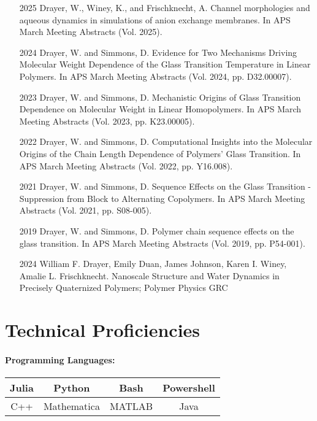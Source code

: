 \documentclass{my_cv}
\begin{document}
\begin{itemize}
    \item[2025] Drayer, W., Winey, K., and Frischknecht, A. Channel morphologies and aqueous dynamics in simulations of anion exchange membranes. In APS March Meeting Abstracts (Vol. 2025).
    \item[2024] Drayer, W. and Simmons, D. Evidence for Two Mechanisms Driving Molecular Weight Dependence of the Glass Transition Temperature in Linear Polymers. In APS March Meeting Abstracts (Vol. 2024, pp. D32.00007).
    \item[2023] Drayer, W. and Simmons, D. Mechanistic Origins of Glass Transition Dependence on Molecular Weight in Linear Homo\-polymers. In APS March Meeting Abstracts (Vol. 2023, pp. K23.00005). 
    \item[2022] Drayer, W. and Simmons, D. Computational Insights into the Molecular Origins of the Chain Length Dependence of Polymers' Glass Transition. In APS March Meeting Abstracts (Vol. 2022, pp. Y16.008).
    \item[2021] Drayer, W. and Simmons, D. Sequence Effects on the Glass Transition - Suppression from Block to Alternating Co\-polymers. In APS March Meeting Abstracts (Vol. 2021, pp. S08-005).
    \item[2019] Drayer, W. and Simmons, D. Polymer chain sequence effects on the glass transition. In APS March Meeting Abstracts (Vol. 2019, pp. P54-001).
\end{itemize}

\begin{itemize}
    \item[2024] William F. Drayer, Emily Duan, James Johnson, Karen I. Winey, Amalie L. Frischknecht. 
    Nano\-scale Structure and Water Dynamics in Precisely Quaternized Polymers; Polymer Physics GRC
\end{itemize}

\section{Technical Proficiencies}

\paragraph{Programming Languages:}
\begin{center}
\begin{tabular}{c|c|c|c}
    Julia & Python & Bash & Power\-shell \\
    \hline
    C++ & Mathematica & MATLAB & Java \\
\end{tabular}
\end{center}
\end{document}
